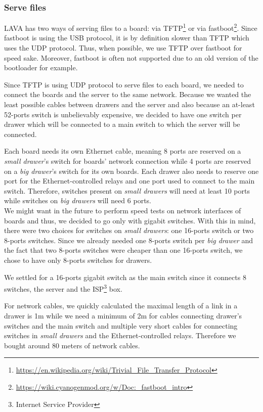 \subsubsection{Serve files}

LAVA has two ways of serving files to a board: via TFTP\footnote{\url{https://en.wikipedia.org/wiki/Trivial\_File\_Transfer\_Protocol}} or via fastboot\footnote{\url{https://wiki.cyanogenmod.org/w/Doc:\_fastboot\_intro}}. Since fastboot is using the USB protocol, it is by definition slower than TFTP which uses the UDP protocol. Thus, when possible, we use TFTP over fastboot for speed sake. Moreover, fastboot is often not supported due to an old version of the bootloader for example.

Since TFTP is using UDP protocol to serve files to each board, we needed to connect the boards and the server to the same network. Because we wanted the least possible cables between drawers and the server and also because an at-least 52-ports switch is unbelievably expensive, we decided to have one switch per drawer which will be connected to a main switch to which the server will be connected.

Each board needs its own Ethernet cable, meaning 8 ports are reserved on a \textit{small drawer}'s switch for boards' network connection while 4 ports are reserved on a \textit{big drawer}'s switch for its own boards. Each drawer also needs to reserve one port for the Ethernet-controlled relays and one port used to connect to the main switch. Therefore, switches present on \textit{small drawers} will need at least 10 ports while switches on \textit{big drawers} will need 6 ports.\\
We might want in the future to perform speed tests on network interfaces of boards and thus, we decided to go only with gigabit switches. With this in mind, there were two choices for switches on \textit{small drawers}: one 16-ports switch or two 8-ports switches. Since we already needed one 8-ports switch per \textit{big drawer} and the fact that two 8-ports switches were cheaper than one 16-ports switch, we chose to have only 8-ports switches for drawers.

We settled for a 16-ports gigabit switch as the main switch since it connects 8 switches, the server and the ISP\footnote{Internet Service Provider} box.

For network cables, we quickly calculated the maximal length of a link in a drawer is 1m while we need a minimum of 2m for cables connecting drawer's switches and the main switch and multiple very short cables for connecting switches in \textit{small drawers} and the Ethernet-controlled relays. Therefore we bought around 80 meters of network cables.

